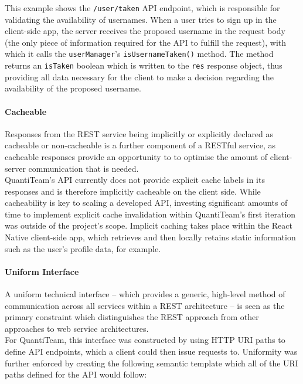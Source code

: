 This example shows the \texttt{/user/taken} API endpoint, which is
responsible for validating the availability of usernames. When a user
tries to sign up in the client-side app, the server receives the
proposed username in the request body (the only piece of information
required for the API to fulfill the request), with which it calls the
\texttt{userManager}'s \texttt{isUsernameTaken()} method. The method
returns an \texttt{isTaken} boolean which is written to the \texttt{res}
response object, thus providing all data necessary for the client to
make a decision regarding the availability of the proposed username.

\paragraph{Cacheable}\label{cacheable}

Responses from the REST service being implicitly or explicitly declared
as cacheable or non-cacheable is a further component of a RESTful
service\cite{1rest}, as
cacheable responses provide an opportunity to to optimise the amount of
client-server communication that is needed.\\
QuantiTeam's API currently does not provide explicit cache labels in its
responses and is therefore implicitly cacheable on the client side.
While cacheability is key to scaling a developed API, investing
significant amounts of time to implement explicit cache invalidation
within QuantiTeam's first iteration was outside of the project's scope.
Implicit caching takes place within the React Native client-side app,
which retrieves and then locally retains static information such as the
user's profile data, for example.

\paragraph{Uniform Interface}\label{uniform-interface}

A uniform technical interface -- which provides a generic, high-level
method of communication across all services within a REST architecture
-- is seen as the primary constraint which distinguishes the REST
approach from other approaches to web service
architectures\cite{1rest}.\\
For QuantiTeam, this interface was constructed by using HTTP URI paths
to define API endpoints, which a client could then issue requests to.
Uniformity was further enforced by creating the following semantic
template which all of the URI paths defined for the API would follow:

